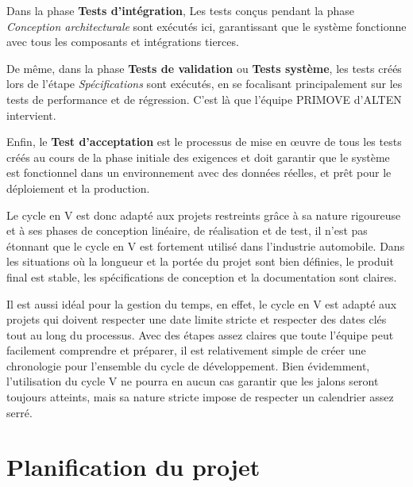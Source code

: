 Dans la phase \textbf{Tests d'intégration}, Les tests conçus pendant la phase \textit{Conception architecturale} sont exécutés ici, garantissant que le système fonctionne avec tous les composants et intégrations tierces.

De même, dans la phase \textbf{Tests de validation} ou \textbf{Tests système}, les tests créés lors de l'étape \textit{Spécifications} sont exécutés, en se focalisant principalement sur les tests de performance et de régression. C'est là que l'équipe PRIMOVE d'ALTEN intervient.

Enfin, le \textbf{Test d'acceptation} est le processus de mise en œuvre de tous les tests créés au cours de la phase initiale des exigences et doit garantir que le système est fonctionnel dans un environnement avec des données réelles, et prêt pour le déploiement et la production.


Le cycle en V est donc adapté aux projets restreints grâce à sa nature rigoureuse et à ses phases de conception linéaire, de réalisation et de test, il n'est pas étonnant que le cycle en V est fortement utilisé dans l'industrie automobile. Dans les situations où la longueur et la portée du projet sont bien définies, le produit final est stable, les spécifications de conception et la documentation sont claires.

Il est aussi idéal pour la gestion du temps, en effet, le cycle en V est adapté aux projets qui doivent respecter une date limite stricte et respecter des dates clés tout au long du processus. Avec des étapes assez claires que toute l'équipe peut facilement comprendre et préparer, il est relativement simple de créer une chronologie pour l'ensemble du cycle de développement. Bien évidemment, l'utilisation du cycle V ne pourra en aucun cas garantir que les jalons seront toujours atteints, mais sa nature stricte impose de respecter un calendrier assez serré.

\section{Planification du projet}

